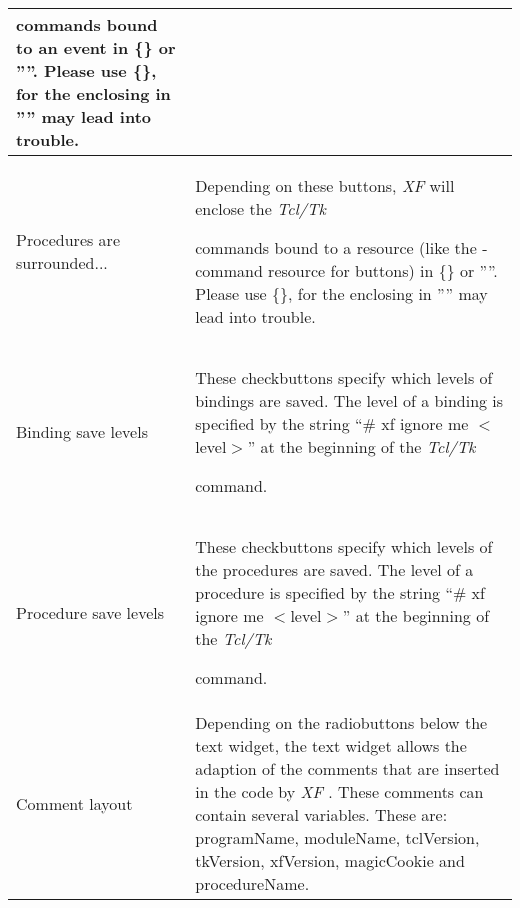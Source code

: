 {\begin{supertabular}{|l|p{6.2cm}|}
                               commands bound to an event in
                               \{\} or ''''. Please use
                               \{\}, for the enclosing in
                               '''' may lead into trouble.\\  \hline
Procedures are surrounded... & Depending on these buttons,
                               {\em XF }
 will enclose the {\em Tcl/Tk }

                               commands bound to a resource
                               (like the -command resource
                               for buttons) in \{\} or ''''.
                               Please use \{\}, for the
                               enclosing in '''' may lead
                               into trouble.\\  \hline
Binding save levels          & These checkbuttons specify
                               which levels of bindings are
                               saved. The level of a
                               binding is specified by the
                               string ``\# xf ignore me
                               $<$level$>$'' at the
                               beginning of the {\em Tcl/Tk }

                               command.\\  \hline
Procedure save levels        & These checkbuttons specify
                               which levels of the
                               procedures are saved. The
                               level of a procedure is
                               specified by the string ``\#
                               xf ignore me $<$level$>$'' at
                               the beginning of the {\em Tcl/Tk }

                               command.\\  \hline
Comment layout               & Depending on the radiobuttons
                               below the text widget, the
                               text widget allows the
                               adaption of the comments that
                               are inserted in the code by
                               {\em XF}
. These comments can
                               contain several variables.
                               These are: programName,
                               moduleName, tclVersion,
                               tkVersion, xfVersion,
                               magicCookie and procedureName.\\ 
\end{supertabular}
}

